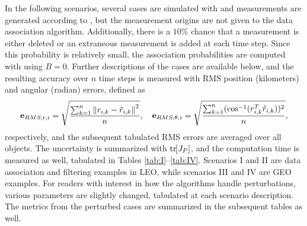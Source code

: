 In the following scenarios, several cases are simulated with  and measurements are generated according to , but the measurement origins are not given to the data association algorithm.
Additionally, there is a $10\%$ chance that a measurement is either deleted or an extraneous measurement is added at each time step.
Since this probability is relatively small, the association probabilities are computed with  using $B=0$.
Further descriptions of the cases are available below, and the resulting accuracy over $n$ time steps is measured with RMS position (kilometers) and angular (radian) errors, defined as
\begin{align}
\mathbf{e}_{RMS,r,i}=\sqrt{\frac{\sum_{k=1}^n\left\| r_{i,k}-\hat r_{i,k} \right\|^2}{n}}
, \quad
\mathbf{e}_{RMS,\theta,i}=\sqrt{\frac{\sum_{k=1}^n(\cos^{-1}(r_{i,k}^T\hat r_{i,k}))^2}{n}}
,
\end{align}
respectively, and the subsequent tabulated RMS errors are averaged over all objects. The uncertainty is summarized with $\mathrm{tr}\negthickspace\left[ J_P \right]$, and the computation time is measured as well, tabulated in Tables \ref{tab:I}--\ref{tab:IV}.
Scenarios I and II are data association and filtering examples in LEO, while scenarios III and IV are GEO examples.
For readers with interest in how the algorithms handle perturbations, various parameters are slightly changed, tabulated at each scenario description.
The metrics from the perturbed cases are summarized in the subsequent tables as well.


